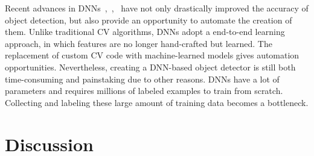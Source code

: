 Recent advances in
DNNs~\cite{girshick2014rich},~\cite{ren2015faster},~\cite{he2016deep} have not
only drastically improved the accuracy of object detection, but also provide an
opportunity to automate the creation of them. Unlike traditional CV algorithms,
DNNs adopt a end-to-end learning approach, in which features are no longer
hand-crafted but learned. The replacement of custom CV code with machine-learned
models gives automation opportunities. Nevertheless, creating a DNN-based object
detector is still both time-consuming and painstaking due to other reasons. DNNs
have a lot of parameters and requires millions of labeled examples to train from
scratch. Collecting and labeling these large amount of training data becomes a
bottleneck.



\section{Discussion}
